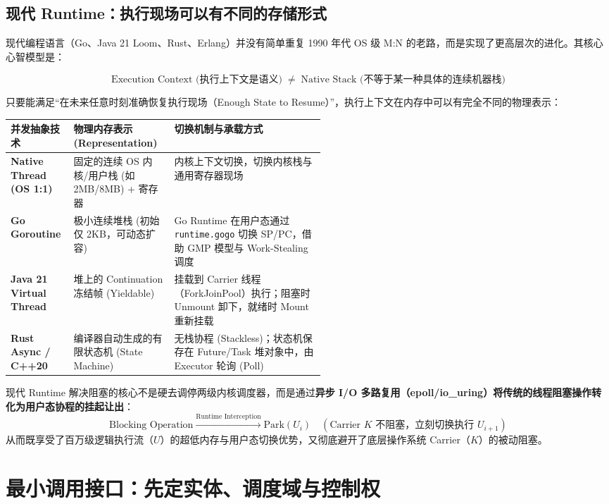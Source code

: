 \documentclass[11pt,a4paper]{ctexart}
\newcommand{\kw}[1]{\textbf{#1}}
\newcommand{\code}[1]{\texttt{#1}}
\begin{document}
\subsection{现代 Runtime：执行现场可以有不同的存储形式}

现代编程语言（Go、Java 21 Loom、Rust、Erlang）并没有简单重复 1990 年代 OS 级 M:N 的老路，而是实现了更高层次的进化。其核心心智模型是：

\[
\boxed{\text{Execution Context (执行上下文是语义)} \;\;\neq\;\; \text{Native Stack (不等于某一种具体的连续机器栈)}}
\]

只要能满足“在未来任意时刻准确恢复执行现场（Enough State to Resume）”，执行上下文在内存中可以有完全不同的物理表示：

\begingroup
\small
\renewcommand{\arraystretch}{1.25}
\setlength{\tabcolsep}{4pt}
\begin{tabularx}{\linewidth}{>{\bfseries}p{0.20\linewidth} p{0.32\linewidth} X}
\toprule
并发抽象技术 & 物理内存表示 (Representation) & 切换机制与承载方式\\
\midrule
Native Thread (OS 1:1) & 固定的连续 OS 内核/用户栈 (如 2MB/8MB) + 寄存器 & 内核上下文切换，切换内核栈与通用寄存器现场\\
Go Goroutine & 极小连续堆栈 (初始仅 2KB，可动态扩容) & Go Runtime 在用户态通过 \code{runtime.gogo} 切换 SP/PC，借助 GMP 模型与 Work-Stealing 调度\\
Java 21 Virtual Thread & 堆上的 Continuation 冻结帧 (Yieldable) & 挂载到 Carrier 线程（ForkJoinPool）执行；阻塞时 Unmount 卸下，就绪时 Mount 重新挂载\\
Rust Async / C++20 & 编译器自动生成的有限状态机 (State Machine) & 无栈协程 (Stackless)；状态机保存在 Future/Task 堆对象中，由 Executor 轮询 (Poll)\\
\bottomrule
\end{tabularx}
\endgroup

\begin{corebox}
现代 Runtime 解决阻塞的核心不是硬去调停两级内核调度器，而是通过\kw{异步 I/O 多路复用（epoll/io\_uring）将传统的线程阻塞操作转化为用户态协程的挂起让出}：
\[
\boxed{\text{Blocking Operation} \xrightarrow{\text{Runtime Interception}} \text{Park}(U_i) \quad (\text{Carrier } K \text{ 不阻塞，立刻切换执行 } U_{i+1})}
\]
从而既享受了百万级逻辑执行流（$U$）的超低内存与用户态切换优势，又彻底避开了底层操作系统 Carrier（$K$）的被动阻塞。
\end{corebox}

\section{最小调用接口：先定实体、调度域与控制权}
\end{document}
